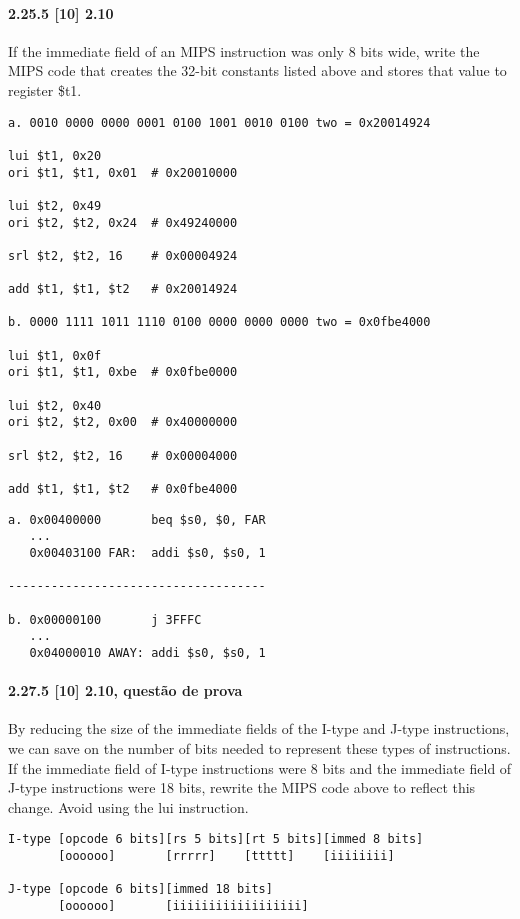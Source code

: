 \documentclass{article}
\begin{document}
\paragraph{2.25.5  [10] 2.10} If the immediate field of an MIPS instruction was 
only 8 bits wide, write the MIPS code that creates the 32-bit constants listed 
above and stores that value to register \$t1.

\begin{verbatim}
a. 0010 0000 0000 0001 0100 1001 0010 0100 two = 0x20014924

lui $t1, 0x20
ori $t1, $t1, 0x01  # 0x20010000

lui $t2, 0x49
ori $t2, $t2, 0x24  # 0x49240000

srl $t2, $t2, 16    # 0x00004924

add $t1, $t1, $t2   # 0x20014924

b. 0000 1111 1011 1110 0100 0000 0000 0000 two = 0x0fbe4000

lui $t1, 0x0f
ori $t1, $t1, 0xbe  # 0x0fbe0000

lui $t2, 0x40
ori $t2, $t2, 0x00  # 0x40000000

srl $t2, $t2, 16    # 0x00004000

add $t1, $t1, $t2   # 0x0fbe4000
\end{verbatim}


\pagebreak

\begin{verbatim}
a. 0x00400000       beq $s0, $0, FAR
   ...
   0x00403100 FAR:  addi $s0, $s0, 1

------------------------------------

b. 0x00000100       j 3FFFC
   ...
   0x04000010 AWAY: addi $s0, $s0, 1
\end{verbatim}

\paragraph{2.27.5 [10] 2.10, questão de prova} By reducing the size of the
immediate fields of the I-type and J-type instructions, we can save on the
number of bits needed to represent these types of instructions. If the immediate
field of I-type instructions were 8 bits and the immediate field of J-type
instructions were 18 bits, rewrite the MIPS code above to reflect this change.
Avoid using the lui instruction.

\begin{verbatim}
I-type [opcode 6 bits][rs 5 bits][rt 5 bits][immed 8 bits]
       [oooooo]       [rrrrr]    [ttttt]    [iiiiiiii]

J-type [opcode 6 bits][immed 18 bits]
       [oooooo]       [iiiiiiiiiiiiiiiiii]
\end{verbatim}
\end{document}
